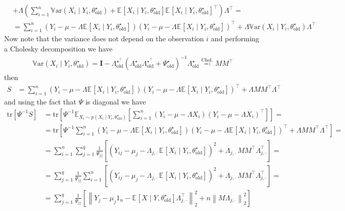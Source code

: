 \documentclass[10pt,notitlepage]{article}
\newcommand{\mean}[2][]{\mathbb{E}_{#1}\left[#2\right]}
\newcommand{\var}[2][]{\mathbb{V}_{#1}\text{ar}\left(#2\right)}
\newcommand{\norm}[1]{\left\lVert #1\right\rVert}
\newcommand{\tr}[1]{\text{tr}\left[#1\right]}
\newcommand{\Id}{\mathbf{I}}
\begin{document}
\begin{exercise}[Solution]
\begin{align*}
            &+ \Lambda\left(\sum_{i=1}^{n}\var{X_i\mid Y_i, \theta^\star_{\text{old}}}+\mean{X_i\mid Y_i, \theta^\star_{\text{old}}}\mean{X_i\mid Y_i, \theta^\star_{\text{old}}}^\top\right)\Lambda^\top = \\
            &= \sum_{i=1}^{n}\left(Y_i-\mu-\Lambda\mean{X_i\mid Y_i, \theta^\star_{\text{old}}}\right) \left(Y_i-\mu-\Lambda\mean{X_i\mid Y_i, \theta^\star_{\text{old}}}\right)^\top + \Lambda\var{X_i\mid Y_i, \theta^\star_{\text{old}}}\Lambda^\top
        \end{align*}
        Now note that the variance does not depend on the observation $i$ and performing a Cholesky decomposition we have
        \begin{align*}
            \var{X_i\mid Y_i, \theta^\star_{\text{old}}} = \Id-\Lambda^{\star^\top}_{\text{old}}\left(\Lambda^\star_{\text{old}}\Lambda^{\star^\top}_{\text{old}}+\Psi^\star_{\text{old}}\right)^{-1}\Lambda^\star_{\text{old}} \overset{\text{Chol.}}{\eqcolon} MM^\top
        \end{align*}
        then
        \begin{align*}
            S &= \sum_{i=1}^{n}\left(Y_i-\mu-\Lambda\mean{X_i\mid Y_i, \theta^\star_{\text{old}}}\right) \left(Y_i-\mu-\Lambda\mean{X_i\mid Y_i, \theta^\star_{\text{old}}}\right)^\top + \Lambda MM^\top\Lambda^\top
        \end{align*}
        and using the fact that $\Psi$ is diagonal we have
        \begin{align*}
            \tr{\Psi^{-1}S} &= \tr{\Psi^{-1}\mean[X_i\sim p\left(X_i\mid Y_i, \theta^\star_{\text{old}}\right)]{\sum_{i=1}^{n}\left(Y_i - \mu - \Lambda X_i\right)\left(Y_i - \mu - \Lambda X_i\right)^\top}} =\\
            &= \tr{\Psi^{-1}\sum_{i=1}^{n}\left(Y_i-\mu-\Lambda\mean{X_i\mid Y_i, \theta^\star_{\text{old}}}\right) \left(Y_i-\mu-\Lambda\mean{X_i\mid Y_i, \theta^\star_{\text{old}}}\right)^\top + \Lambda MM^\top\Lambda^\top} = \\
            &= \sum_{i=1}^{n}\sum_{j=1}^{q}\frac{1}{\Psi_{jj}}\left[\left(Y_{ij}-\mu_j-\Lambda_{j,\cdot}\,\mean{X_i\mid Y_i, \theta^\star_{\text{old}}}\right)^2 + \Lambda_{j,\cdot}\, MM^\top\Lambda_{j,\cdot}^\top\right] = \\
            &= \sum_{j=1}^{q}\frac{1}{\Psi_{jj}}\sum_{i=1}^{n}\left[\left(Y_{ij}-\mu_j-\Lambda_{j,\cdot}\,\mean{X_i\mid Y_i, \theta^\star_{\text{old}}}\right)^2 + \Lambda_{j,\cdot}\, MM^\top\Lambda_{j,\cdot}^\top\right] = \\
            &= \sum_{j=1}^{q}\frac{1}{\Psi_{jj}}\left[\norm{Y_j-\mu_j 1_n - \mean{X\mid Y, \theta^\star_{\text{old}}}\Lambda_{j,\cdot}^\top}_2^2 + n\norm{M \Lambda_{j,\cdot}}_2^2\right]

\end{align*}
\end{exercise}
\end{document}
